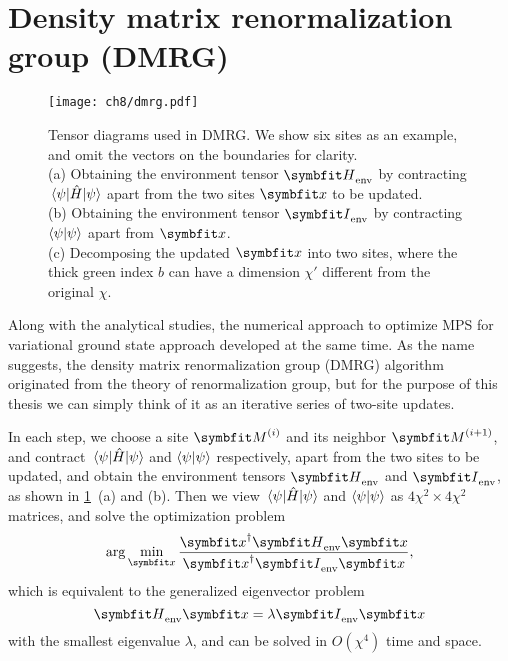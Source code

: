 \section{Density matrix renormalization group (DMRG)}
\label{sec:dmrg}

\begin{figure}[htb]
\centering
\texttt{[image: ch8/dmrg.pdf]}
\caption[Density matrix renormalization group (DMRG)]{
Tensor diagrams used in DMRG. We show six sites as an example, and omit the vectors on the boundaries for clarity. \\
(a) Obtaining the environment tensor $\mH_\text{env}$ by contracting $\mel{\psi}{\hat{H}}{\psi}$ apart from the two sites $\vx$ to be updated. \\
(b) Obtaining the environment tensor $\mI_\text{env}$ by contracting $\ip{\psi}$ apart from $\vx$. \\
(c) Decomposing the updated $\vx$ into two sites, where the thick green index $b$ can have a dimension $\chi'$ different from the original $\chi$.
}
\label{fig:dmrg}
\end{figure}

Along with the analytical studies, the numerical approach to optimize MPS for variational ground state approach developed at the same time. As the name suggests, the density matrix renormalization group (DMRG) algorithm~\cite{white1992density, schollwock2005density} originated from the theory of renormalization group, but for the purpose of this thesis we can simply think of it as an iterative series of two-site updates.

In each step, we choose a site $\mM^{(i)}$ and its neighbor $\mM^{(i + 1)}$, and contract $\mel{\psi}{\hat{H}}{\psi}$ and $\ip{\psi}$ respectively, apart from the two sites to be updated, and obtain the environment tensors $\mH_\text{env}$ and $\mI_\text{env}$, as shown in \cref{fig:dmrg}~(a) and (b). Then we view $\mel{\psi}{\hat{H}}{\psi}$ and $\ip{\psi}$ as $4 \chi^2 \times 4 \chi^2$ matrices, and solve the optimization problem
\begin{equation}
\arg\min_\vx \frac{\vx^\dagger \mH_\text{env} \vx}{\vx^\dagger \mI_\text{env} \vx},
\end{equation}
which is equivalent to the generalized eigenvector problem
\begin{equation}
\mH_\text{env} \vx = \lambda \mI_\text{env} \vx
\end{equation}
with the smallest eigenvalue $\lambda$, and can be solved in $O(\chi^4)$ time and space.

